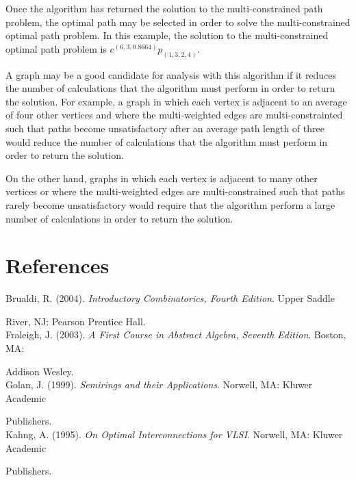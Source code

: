 \documentclass[12pt]{amsart}
\theoremstyle{definition}
\theoremstyle{remark}
\numberwithin{equation}{section}
\begin{document}
\hspace{1cm}

Once the algorithm has returned the solution to the multi-constrained path problem, the optimal path may be selected in order to solve the multi-constrained optimal path problem. In this example, the solution to the multi-constrained optimal path problem is $c^{(6,3,0.8664)} p_{(1,3,2,4)}$.

A graph may be a good candidate for analysis with this algorithm if it reduces the number of calculations that the algorithm must perform in order to return the solution. For example, a graph in which each vertex is adjacent to an average of four other vertices and where the multi-weighted edges are multi-constrainted such that paths become unsatisfactory after an average path length of three would reduce the number of calculations that the algorithm must perform in order to return the solution.

On the other hand, graphs in which each vertex is adjacent to many other vertices or where the multi-weighted edges are multi-constrained such that paths rarely become unsatisfactory would require that the algorithm perform a large number of calculations in order to return the solution.

\newpage

\section{References}

\hspace{1cm}

\noindent Brualdi, R. (2004). \emph{Introductory Combinatorics, Fourth Edition}. Upper Saddle

River, NJ: Pearson Prentice Hall.\\

\noindent Fraleigh, J. (2003). \emph{A First Course in Abstract Algebra, Seventh Edition}. Boston, MA:

Addison Wesley.\\

\noindent Golan, J. (1999). \emph{Semirings and their Applications}. Norwell, MA: Kluwer Academic

Publishers.\\

\noindent Kahng, A. (1995). \emph{On Optimal Interconnections for VLSI}. Norwell, MA: Kluwer Academic

Publishers. \\
\end{document}
